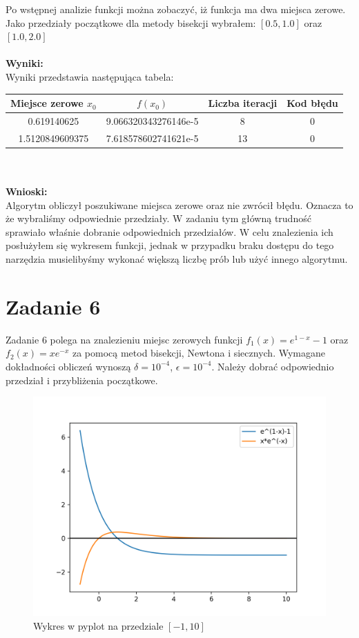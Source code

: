 \documentclass[12pt]{article}
\begin{document}
Po wstępnej analizie funkcji można zobaczyć, iż funkcja ma dwa miejsca zerowe. Jako przedziały początkowe dla metody bisekcji wybrałem: $[0.5, 1.0]$ oraz $[1.0, 2.0]$
\\
\\
\noindent \textbf{Wyniki:}\\
Wyniki przedstawia następująca tabela:
\begin{table}[h!]
	\centering
    \label{tab:table2}
    \begin{tabular}{c|c|c|c}
		Miejsce zerowe $x_0$ & $f(x_0)$ & Liczba iteracji & Kod błędu \\
 		\hline
 		\hline
		0.619140625 & 9.066320343276146e-5 & 8 & 0\\
		\hline
		1.5120849609375 & 7.618578602741621e-5 & 13 & 0\\
		\hline
    \end{tabular}
\end{table}
\\
\\
\noindent \textbf{Wnioski:}\\
Algorytm obliczył poszukiwane miejsca zerowe oraz nie zwrócił błędu. Oznacza to że wybraliśmy odpowiednie przedziały. W zadaniu tym główną trudność sprawiało właśnie dobranie odpowiednich przedziałów. W celu znalezienia ich posłużyłem się wykresem funkcji, jednak w przypadku braku dostępu do tego narzędzia musielibyśmy wykonać większą liczbę prób lub użyć innego algorytmu.

\section{Zadanie 6}
Zadanie 6 polega na znalezieniu miejsc zerowych funkcji $f_1(x)=e^{1-x}-1$ oraz $f_2(x)=xe^{-x}$ za pomocą metod bisekcji, Newtona i siecznych. Wymagane dokładności obliczeń wynoszą $\delta=10^{-4}$, $\epsilon=10^{-4}$. Należy dobrać odpowiednio przedział i przybliżenia początkowe. 
\begin{figure}[!h]
	\centering
  \includegraphics[width=0.6\linewidth]{zad6_plot.png}
  \caption{Wykres w pyplot na przedziale $[-1, 10]$}\label{fig:figure4}
\end{figure}
\end{document}
